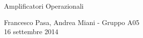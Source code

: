 \documentclass[11pt, twoside, a4paper]{article}
\begin{document}
  \begin{center}
  
    {\huge Amplificatori Operazionali}
    
    \vspace{0.1cm}
    
    {Francesco Pasa, Andrea Miani - Gruppo A05} \\
    {16 settembre 2014}
    
    \vspace{-0.2cm}
    
  \end{center}
  
  
  
  
  
\end{document}
